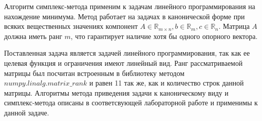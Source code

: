 \documentclass[../body.tex]{subfiles}
\begin{document}
Алгоритм симплекс-метода применим к задачам линейного программирования на нахождение минимума. Метод работает на задачах в канонической форме при всяких вещественных значениях компонент $A\in\mathbb{R}_{m\times{n}},b\in\mathbb{R}_m,c\in\mathbb{R}_n$. Матрица $A$ должна иметь ранг $m$, что гарантирует наличие хотя бы одного опорного вектора.

Поставленная задача является задачей линейного программирования, так как ее целевая функция и ограничения имеют линейный вид. Ранг рассматриваемой матрицы был посчитан встроенным в библиотеку методом $numpy.linalg.matrix\_rank$ и равен 11 так же, как и количество строк данной матрицы. Алгоритмы метода приведения задачи к каноническому виду и симплекс-метода описаны в соответсвующей лабораторной работе и применимы к данной задаче.
\end{document}
